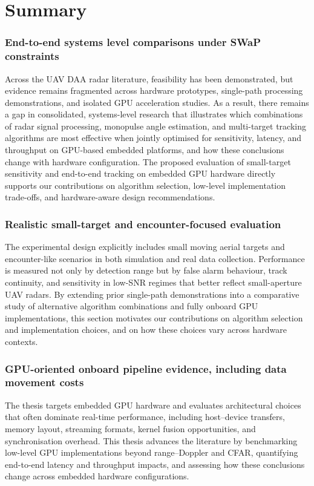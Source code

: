 \section{Summary}
\subsubsection{End-to-end systems level comparisons under SWaP constraints}
Across the UAV DAA radar literature, feasibility has been demonstrated, but evidence remains fragmented across hardware prototypes, single-path processing demonstrations, and isolated GPU acceleration studies. As a result, there remains a gap in consolidated, systems-level research that illustrates which combinations of radar signal processing, monopulse angle estimation, and multi-target tracking algorithms are most effective when jointly optimised for sensitivity, latency, and throughput on GPU-based embedded platforms, and how these conclusions change with hardware configuration. The proposed evaluation of small-target sensitivity and end-to-end tracking on embedded GPU hardware directly supports our contributions on algorithm selection, low-level implementation trade-offs, and hardware-aware design recommendations. 

\subsubsection{Realistic small-target and encounter-focused evaluation}
The experimental design explicitly includes small moving aerial targets and encounter-like scenarios in both simulation and real data collection. Performance is measured not only by detection range but by false alarm behaviour, track continuity, and sensitivity in low-SNR regimes that better reflect small-aperture UAV radars. By extending prior single-path demonstrations into a comparative study of alternative algorithm combinations and fully onboard GPU implementations, this section motivates our contributions on algorithm selection and implementation choices, and on how these choices vary across hardware contexts.

\subsubsection{GPU-oriented onboard pipeline evidence, including data movement costs}
The thesis targets embedded GPU hardware and evaluates architectural choices that often dominate real-time performance, including host–device transfers, memory layout, streaming formats, kernel fusion opportunities, and synchronisation overhead. This thesis advances the literature by benchmarking low-level GPU implementations beyond range--Doppler and CFAR, quantifying end-to-end latency and throughput impacts, and assessing how these conclusions change across embedded hardware configurations.

